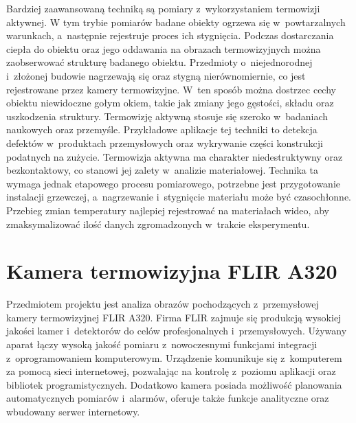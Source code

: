 Bardziej zaawansowaną techniką są pomiary z~wykorzystaniem termowizji
aktywnej.
W tym trybie pomiarów badane obiekty ogrzewa się w~powtarzalnych warunkach, 
a~następnie rejestruje proces ich stygnięcia.
Podczas dostarczania ciepła do obiektu oraz jego oddawania na obrazach
termowizyjnych można zaobserwować strukturę badanego obiektu.
Przedmioty o~niejednorodnej i~złożonej budowie nagrzewają się oraz stygną
nierównomiernie, co jest rejestrowane przez kamery termowizyjne.
W~ten sposób można dostrzec cechy obiektu niewidoczne gołym okiem, takie
jak zmiany jego gęstości, składu oraz uszkodzenia struktury.
Termowizję aktywną stosuje się szeroko w~badaniach naukowych oraz przemyśle.
Przykładowe aplikacje tej techniki to detekcja defektów w~produktach
przemysłowych oraz wykrywanie części konstrukcji podatnych na zużycie.
Termowizja aktywna ma charakter niedestruktywny oraz bezkontaktowy,
co stanowi jej zalety w~analizie materiałowej.
Technika ta wymaga jednak etapowego procesu pomiarowego, potrzebne jest 
przygotowanie instalacji grzewczej, a~nagrzewanie i~stygnięcie materiału
może być czasochłonne.
Przebieg zmian temperatury najlepiej rejestrować na materiałach wideo,
aby zmaksymalizować ilość danych zgromadzonych w~trakcie eksperymentu.

\section{Kamera termowizyjna FLIR A320}
\label{sec:camera}
Przedmiotem projektu jest analiza obrazów pochodzących z~przemysłowej
kamery termowizyjnej FLIR A320.
Firma FLIR zajmuje się produkcją wysokiej jakości kamer i~detektorów do celów
profesjonalnych i~przemysłowych.
Używany aparat łączy wysoką jakość pomiaru z~nowoczesnymi funkcjami
integracji z~oprogramowaniem komputerowym.
Urządzenie komunikuje się z~komputerem za pomocą sieci internetowej,
pozwalając na kontrolę z~poziomu aplikacji oraz bibliotek
programistycznych.
Dodatkowo kamera posiada możliwość planowania automatycznych pomiarów
i~alarmów, oferuje także funkcje analityczne oraz wbudowany serwer
internetowy.

